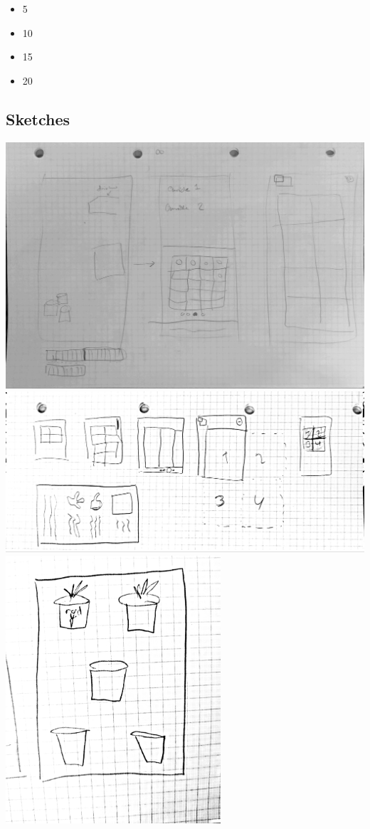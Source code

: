 \begin{itemize}
    \item 5
    \item 10
    \item 15
    \item 20
\end{itemize}

\subsection{Sketches}

\includegraphics[width=1\textwidth]{img/s1-1.jpg}\\
\includegraphics[width=1\textwidth]{img/s1-3.jpg}\\
\includegraphics[width=0.6\textwidth]{img/s1-5.jpg}\\
